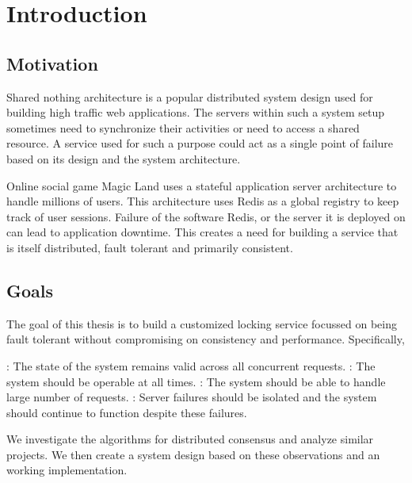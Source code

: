 \chapter{Introduction}
\label{chapter:introduction}

\section{Motivation}

Shared nothing architecture%
 \citep{Stonebraker86g} is a popular distributed system design used for
building high traffic web applications. The servers within such a system setup
sometimes need to synchronize their activities or need to access a shared
resource. A service used for such a purpose could act as a single point of
failure based on its design and the system architecture.

Online social game Magic Land uses a stateful application server architecture to
handle millions of users. This architecture uses Redis as a global registry to
keep track of user sessions. Failure of the software Redis, or the server it
is deployed on can lead to application downtime. This creates a need for
building a service that is itself distributed, fault tolerant and primarily
consistent.

\section{Goals}

The goal of this thesis is to build a customized locking service focussed on
being fault tolerant without compromising on consistency and performance.
Specifically,

\begin{itemize}
    : The state of the system remains valid across
    all concurrent requests.
    : The system should be operable at all times.
    : The system should be able to handle large number of
    requests.
    : Server failures should be isolated and the system
    should continue to function despite these failures.
\end{itemize}

We investigate the algorithms for distributed consensus and analyze similar
projects. We then create a system design based on these observations and
an working implementation.


